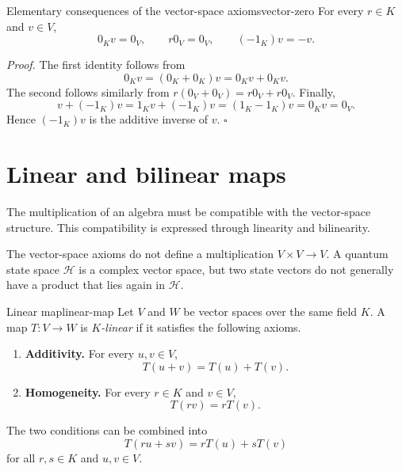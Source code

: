 \documentclass[10pt,a4paper]{article}
\begin{document}
\begin{proposition}{Elementary consequences of the vector-space axioms}{vector-zero}
For every $r\in K$ and $v\in V$,
\[
  0_Kv=0_V,
  \qquad
  r0_V=0_V,
  \qquad
  (-1_K)v=-v.
\]
\end{proposition}

\textit{Proof.}
The first identity follows from
\[
  0_Kv=(0_K+0_K)v=0_Kv+0_Kv.
\]
The second follows similarly from $r(0_V+0_V)=r0_V+r0_V$. Finally,
\[
  v+(-1_K)v=1_Kv+(-1_K)v=(1_K-1_K)v=0_Kv=0_V.
\]
Hence $(-1_K)v$ is the additive inverse of $v$.
\hfill$\square$

\section{Linear and bilinear maps}

The multiplication of an algebra must be compatible with the vector-space
structure. This compatibility is expressed through linearity and bilinearity.

\begin{precision}
The vector-space axioms do not define a multiplication $V\times V\to V$. A
quantum state space $\mathcal H$ is a complex vector space, but two state
vectors do not generally have a product that lies again in $\mathcal H$.
\end{precision}

\begin{definition}{Linear map}{linear-map}
Let $V$ and $W$ be vector spaces over the same field $K$. A map
$T:V\to W$ is \emph{$K$-linear} if it satisfies the following axioms.
\begin{enumerate}[label=\textup{(L\arabic*)}]
  \item \textbf{Additivity.} For every $u,v\in V$,
  \[
    T(u+v)=T(u)+T(v).
  \]

  \item \textbf{Homogeneity.} For every $r\in K$ and $v\in V$,
  \[
    T(rv)=rT(v).
  \]
\end{enumerate}
\end{definition}

The two conditions can be combined into
\[
  T(ru+sv)=rT(u)+sT(v)
\]
for all $r,s\in K$ and $u,v\in V$.
\end{document}
